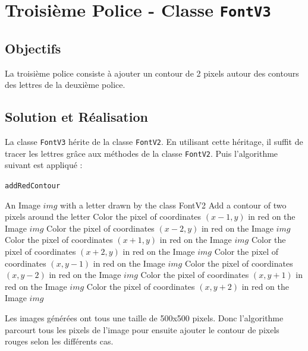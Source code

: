 \documentclass[a4paper, 12pt]{article}
\begin{document}
\newpage
\section{Troisième Police - Classe \texttt{FontV3}}		
\subsection{Objectifs}
La troisième police consiste à ajouter un contour de 2 pixels autour des contours des lettres de la deuxième police. 

\subsection{Solution et Réalisation}
La classe \texttt{FontV3} hérite de la classe \texttt{FontV2}. En utilisant cette héritage, il suffit de tracer les lettres grâce aux méthodes de la classe \texttt{FontV2}. Puis l'algorithme suivant est appliqué :   

\begin{algorithm}
	\caption{\texttt{addRedContour}}
		\begin{algorithmic}[1]
		\Require An Image $img$ with a letter drawn by the class FontV2
		\Ensure Add a contour of two pixels around the letter
						\State Color the pixel of coordinates $(x-1, y)$ in red on the Image $img$
						\State Color the pixel of coordinates $(x-2, y)$ in red on the Image $img$
						\EndIf
						\State Color the pixel of coordinates $(x+1, y)$ in red on the Image $img$
						\State Color the pixel of coordinates $(x+2, y)$ in red on the Image $img$
					\EndIf
						\State Color the pixel of coordinates $(x, y-1)$ in red on the Image $img$
						\State Color the pixel of coordinates $(x, y-2)$ in red on the Image $img$
					\EndIf
						\State Color the pixel of coordinates $(x, y+1)$ in red on the Image $img$
						\State Color the pixel of coordinates $(x, y+2)$ in red on the Image $img$ 
					\EndIf	
				\EndIf	
			\EndFor
		\EndFor
		\EndFunction
		\end{algorithmic}
\end{algorithm}

Les images générées ont tous une taille de 500x500 pixels. Donc l'algorithme parcourt tous les pixels de l'image pour ensuite ajouter le contour de pixels rouges selon les différents cas. \\
\end{document}
